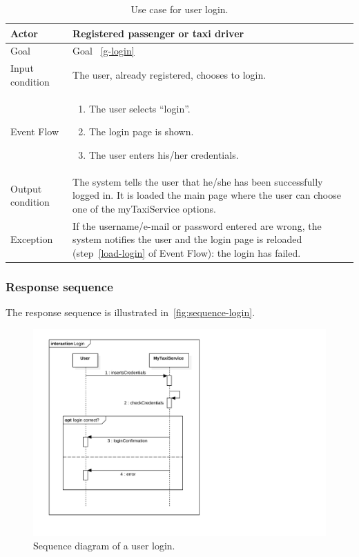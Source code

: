 \begin{table}
\begin{center}
\begin{tabular}{| l | p{} |}
\hline
Actor & Registered passenger or taxi driver \\
\hline
Goal & Goal ~\ref{g-login}
\\
\hline
Input condition & The user, already registered, chooses to login.  \\
\hline
Event Flow & \begin{enumerate}
	\item The user selects ``login''.
	\item The login page is shown. \label{load-login}
	\item The user enters his/her credentials.
	\end{enumerate}
\\
\hline
Output condition & The system tells the user that he/she has been successfully logged in.
It is loaded the main page where the user can choose one of the myTaxiService options. \\
\hline

Exception & If the username/e-mail or password entered are wrong, the system notifies the user and the login page is reloaded (step~\ref{load-login} of Event Flow): the login has failed.
 \\
\hline
\end{tabular}
\end{center}
\caption{Use case for user login.}
\label{usecase-login}
\end{table}

\subsubsection{Response sequence}
The response sequence is illustrated in~\autoref{fig:sequence-login}.
\begin{figure}
\includegraphics[width=\textwidth]{diagrams/sequence_login.pdf}
\caption{Sequence diagram of a user login.}
\label{fig:sequence-login}
\end{figure}

